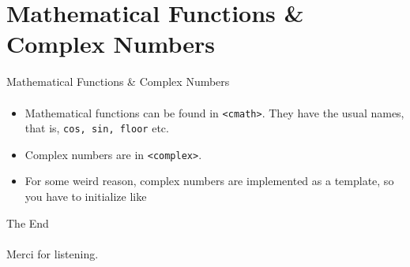\documentclass[presentation]{beamer}
\begin{document}
\section{Mathematical Functions \& Complex Numbers}

\begin{frame}{Mathematical Functions \& Complex Numbers}
\framesubtitle{}

\begin{itemize}
\item Mathematical functions can be found in \texttt{<cmath>}. They
  have the usual names, that is, \texttt{cos, sin, floor} etc.
\item Complex numbers are in \texttt{<complex>}. 
\item For some weird reason, complex numbers are implemented as a
  template, so you have to initialize like 


\end{itemize}


\end{frame}

\begin{frame}{The End}
\framesubtitle{}

\begin{center}
  Merci for listening.
\end{center}


\end{frame}
\end{document}
